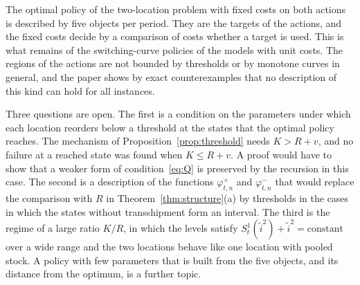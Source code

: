\documentclass[11pt]{article}
\theoremstyle{definition}
\begin{document}
The optimal policy of the two-location problem with fixed costs on both actions is described by five objects per period. They are the targets of the actions, and the fixed costs decide by a comparison of costs whether a target is used. This is what remains of the switching-curve policies of the models with unit costs. The regions of the actions are not bounded by thresholds or by monotone curves in general, and the paper shows by exact counterexamples that no description of this kind can hold for all instances.

Three questions are open. The first is a condition on the parameters under which each location reorders below a threshold at the states that the optimal policy reaches. The mechanism of Proposition~\ref{prop:threshold} needs $K>R+v$, and no failure at a reached state was found when $K\le R+v$. A proof would have to show that a weaker form of condition~\eqref{eq:Q} is preserved by the recursion in this case. The second is a description of the functions $\varphi^{+}_{t,n}$ and $\varphi^{-}_{t,n}$ that would replace the comparison with $R$ in Theorem~\ref{thm:structure}(a) by thresholds in the cases in which the states without transshipment form an interval. The third is the regime of a large ratio $K/R$, in which the levels satisfy $S^1_t(\tilde{i}^2)+\tilde{i}^2=\text{constant}$ over a wide range and the two locations behave like one location with pooled stock. A policy with few parameters that is built from the five objects, and its distance from the optimum, is a further topic.



\end{document}
